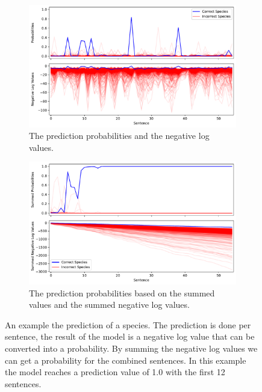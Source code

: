 \documentclass[a4paper, 12pt, oneside]{book} %
\begin{document}
\begin{figure} [htpb]
     \centering
     \begin{subfigure}[b]{1\textwidth}
         \centering
         \includegraphics[width=\textwidth]{figures/probs_nonstacked.pdf}
         \caption{The prediction probabilities and the negative log values.}
         \label{fig:probs_nonstacked}
     \end{subfigure}
     \vfill
     \begin{subfigure}[b]{1\textwidth}
         \centering
         \includegraphics[width=\textwidth]{figures/probs_stacked.pdf}
         \caption{The prediction probabilities based on the summed values and the summed negative log values.}
         \label{fig:probs_stacked}
     \end{subfigure}
     \caption[Species Prediction Probabilities]{An example the prediction of a species. The prediction is done per sentence, the result of the model is a negative log value that can be converted into a probability. By summing the negative log values we can get a probability for the combined sentences. In this example the model reaches a prediction value of 1.0 with the first 12 sentences.}
     \label{fig:species_probabilities}
\end{figure}
\end{document}

